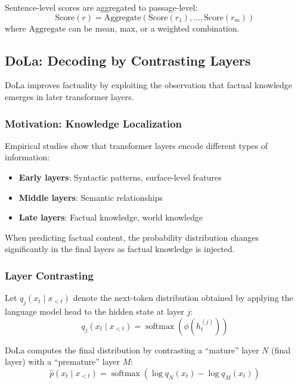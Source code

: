 \documentclass[11pt]{article}
\DeclareMathOperator{\softmax}{softmax}
\begin{document}
Sentence-level scores are aggregated to passage-level:
\begin{equation}
\text{Score}(r) = \text{Aggregate}(\text{Score}(r_1), \ldots, \text{Score}(r_m))
\end{equation}
where $\text{Aggregate}$ can be mean, max, or a weighted combination.

\subsection{DoLa: Decoding by Contrasting Layers}

DoLa improves factuality by exploiting the observation that factual knowledge emerges in later transformer layers.

\subsubsection{Motivation: Knowledge Localization}

Empirical studies show that transformer layers encode different types of information:
\begin{itemize}
    \item \textbf{Early layers}: Syntactic patterns, surface-level features
    \item \textbf{Middle layers}: Semantic relationships
    \item \textbf{Late layers}: Factual knowledge, world knowledge
\end{itemize}

When predicting factual content, the probability distribution changes significantly in the final layers as factual knowledge is injected.

\subsubsection{Layer Contrasting}

Let $q_j(x_t \mid x_{<t})$ denote the next-token distribution obtained by applying the language model head to the hidden state at layer $j$:
\begin{equation}
q_j(x_t \mid x_{<t}) = \softmax(\phi(h_t^{(j)}))
\end{equation}

DoLa computes the final distribution by contrasting a ``mature'' layer $N$ (final layer) with a ``premature'' layer $M$:
\begin{equation}
\hat{p}(x_t \mid x_{<t}) = \softmax\left(\log q_N(x_t) - \log q_M(x_t)\right)
\end{equation}
\end{document}
